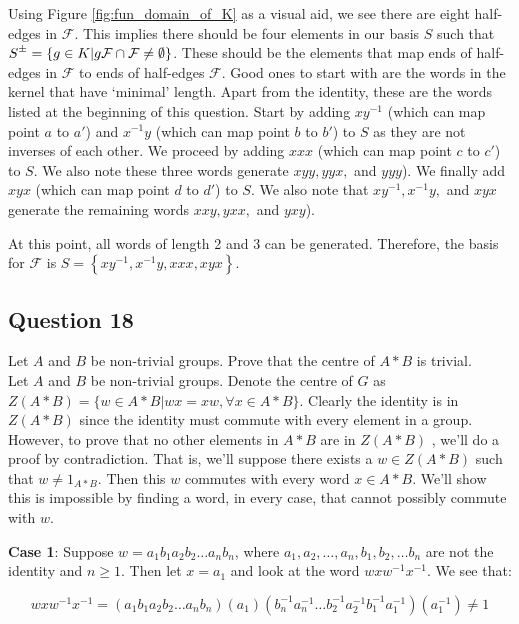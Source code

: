 \documentclass[12pt]{article}%
\newcommand{\rpm}{\raisebox{.2ex}{$\scriptstyle\pm$}}
\begin{document}
Using Figure \ref{fig:fun_domain_of_K} as a visual aid, we see there are eight half-edges in
$\mathcal{F}$. This implies there should be four elements in our basis $S$ such that $S^{\rpm}=\left\{g\in
K | g\mathcal{F} \cap \mathcal{F} \neq \emptyset \right\}$. These should be the elements that map ends of
half-edges in $\mathcal{F}$ to ends of half-edges $\mathcal{F}$.  Good ones to start with are the words in
the kernel that have `minimal' length. Apart from the identity, these are the words listed at the
beginning of this question. Start by adding $xy^{-1}$ (which can map point $a$ to $a'$) and $x^{-1}y$
(which can map point $b$ to $b'$) to $S$ as they are not inverses of each other. We proceed by adding
$xxx$ (which can map point $c$ to $c'$) to $S$. We also note these three words generate $xyy, yyx,$ and
$yyy$). We finally add $xyx$ (which can map point $d$ to $d'$) to $S$. We also note that $xy^{-1},
x^{-1}y,$ and $xyx$  generate the remaining words $xxy, yxx,$ and $yxy$). 

At this point, all words of length 2 and 3 can be generated. Therefore, the basis for $\mathcal{F}$ is
$S=\left\{xy^{-1}, x^{-1}y, xxx, xyx\right\}$.

\subsection*{Question 18}

Let $A$ and $B$ be non-trivial groups. Prove that the centre of $A*B$ is trivial. \\

Let $A$ and $B$ be non-trivial groups. Denote the centre of $G$ as
$Z(A*B)=\{ w \in A*B | wx=xw, \forall x \in A*B \}$. Clearly the identity is in $Z(A*B)$ since the
identity must commute with every element in a group. However, to prove that no other elements in $A*B$ are
in $Z(A*B)$ , we'll do a proof by contradiction. That is, we'll suppose there exists a $w\in Z(A*B)$ such
that $w \neq 1_{A*B}$. Then this $w$ commutes with every word $x \in A*B$. We'll show this is impossible
by finding a word, in every case, that cannot possibly commute with $w$.

\textbf{Case 1}: Suppose $w=a_{1}b_{1}a_{2}b_{2}\ldots a_{n}b_{n}$, where
$a_1,a_2,\ldots ,a_n, b_1,b_2,\ldots b_n$ are not the identity and $n\geq 1$. Then let $x=a_1$ and look
at the word $wxw^{-1}x^{-1}$. We see that:

\begin{dmath}
wxw^{-1}x^{-1}=(a_{1}b_{1}a_{2}b_{2}\ldots a_{n}b_{n})(a_{1})(b_{n}^{-1}a_{n}^{-1}\ldots b_{2}^{-1}a_{2}^{-1}b_{1}^{-1}a_{1}^{-1})(a_{1}^{-1}) \neq 1
\end{dmath}
\end{document}
